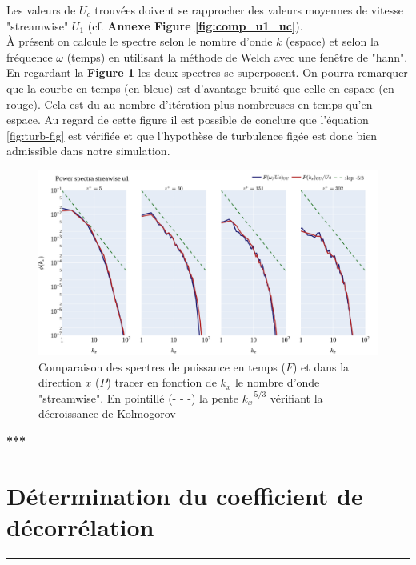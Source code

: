\documentclass[12pt]{article}
\theoremstyle{plain}
\theoremstyle{remark}
\begin{document}
Les valeurs de $U_c$ trouvées doivent se rapprocher des valeurs moyennes de vitesse "streamwise" $U_1$ (cf. {\bf Annexe Figure \ref{fig:comp_u1_uc}}).\\

À présent on calcule le spectre selon le nombre d'onde $k$ (espace) et
selon la fréquence $\omega$ (temps) en utilisant la méthode de Welch \cite{welch1967spectra} avec une fenêtre de "hann". En regardant la {\bf Figure \ref{fig:spectra-space-time}} les deux spectres se superposent. On pourra remarquer que la courbe en temps (en bleue) est d'avantage bruité que celle en espace (en rouge). Cela est du au nombre d'itération plus nombreuses en temps qu'en espace.
Au regard de cette figure il est possible de conclure que l'équation \ref{fig:turb-fig} est vérifiée et que l'hypothèse de turbulence figée est donc bien admissible dans notre simulation.

\begin{figure}[H]
	\begin{center}
		\includegraphics[width=0.85\linewidth]{../../output/figures/channel_wrles_retau395/split_time/frozen_turbulence/power_spectra/u1.png}
		\caption{Comparaison des spectres de puissance en temps ($F$) et dans la direction $x$ ($P$) tracer en fonction de $k_x$ le nombre d'onde "streamwise". En pointillé (- - -) la pente $k_x^{-5/3}$ vérifiant la décroissance de Kolmogorov \cite{kolmogorov1991local}}
		\label{fig:spectra-space-time}
	\end{center}
\end{figure}


\begin{center}
	\large \bf{***}
\end{center}

\vspace{0.3cm}
\section{Détermination du coefficient de décorrélation}
\noindent\rule{\linewidth}{2pt}
\vspace{0.1cm}
\end{document}
